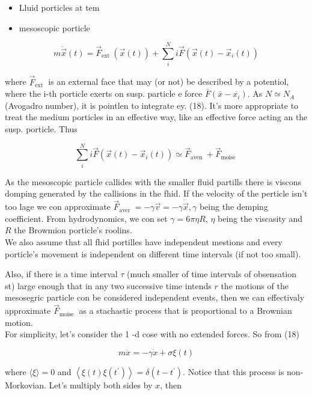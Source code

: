 \documentclass[10pt]{article}
\begin{document}
\begin{itemize}
  \item Lluid porticles at tem
  \item mesoscopic porticle
\end{itemize}


\begin{equation*}
m \ddot{\vec{x}}(t)=\vec{F}_{\text {ext }}(\vec{x}(t))+\sum_{i}^{N} i \vec{F}\left(\vec{x}(t)-\vec{x}_{i}(t)\right) \tag{18}
\end{equation*}


where $\vec{F}_{\text {ext }}$ is an external face that may (or not) be described by a potentiol, where the i-th porticle exerts on susp. particle e force $\bar{F}\left(\bar{x}-\overline{x_{i}}\right)$. As $N \simeq N_{A}$ (Avogadro number), it is pointlen to integrate ey. (18). It's more appropriate to treat the medium porticles in an effective way, like an effective force acting an the susp. porticle. Thus

$$
\sum_{i}^{N} i \vec{F}\left(\vec{x}(t)-\vec{x}_{i}(t)\right) \simeq \vec{F}_{\text {aven }}+\vec{F}_{\text {moise }}
$$

As the mesoscopic particle callides with the smaller fluid partills there is viscons domping generated by the callisions in the fhid. If the velocity of the perticle isn't too lage we con approximate $\vec{F}_{\text {aver }}=-\gamma \vec{v}=-\gamma \dot{\vec{x}}, \gamma$ being the demping coefficient. From hydrodynomics, we con set $\gamma=6 \pi \eta R$, $\eta$ being the viscasity and $R$ the Browmion porticle's roolins.\\
We also assume that all fhid portilles have independent mestions and every porticle's movement is independent on different time intervals (if not too small).

Also, if there is a time interval $\tau$ (much smaller of time intervals of obsensation st) large enough that in any two successive time intends $r$ the motions of the mesosegric particle con be considered independent events, then we can effectivaly approximate $\vec{F}_{\text {moise }}$ as a stachastic process that is proportional to a Brownian motion.\\
For simplicity, let's consider the 1 -d cose with no extended forces. So from (18)


\begin{equation*}
m \ddot{x}=-\gamma \dot{x}+\sigma \xi(t) \tag{19}
\end{equation*}


where $\langle\xi\rangle=0$ and $\left\langle\xi(t) \xi\left(t^{\prime}\right)\right\rangle=\delta\left(t-t^{\prime}\right)$. Notice that this process is non-Morkovian. Let's multiply both sides by $x$, then
\end{document}
